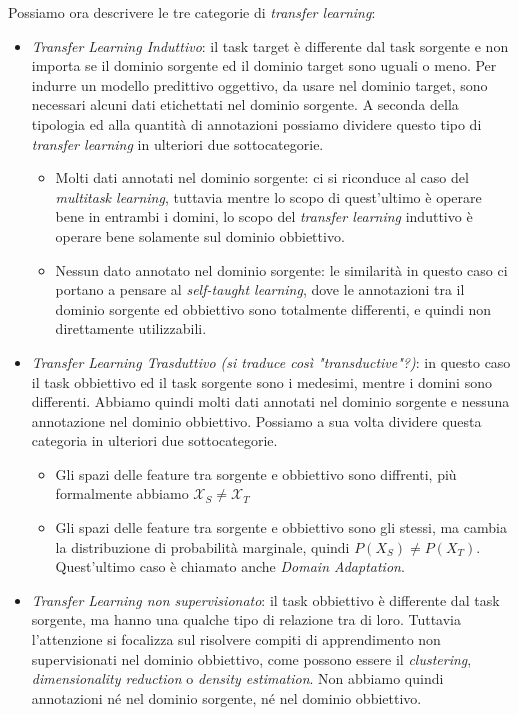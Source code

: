 Possiamo ora descrivere le tre categorie di \textit{transfer learning}:
\begin{itemize}
    \item \emph{Transfer Learning Induttivo}: il task target è differente dal task sorgente e non importa se il dominio sorgente ed il dominio target sono uguali o meno. Per indurre un modello predittivo oggettivo, da usare nel dominio target, sono necessari alcuni dati etichettati nel dominio sorgente. A seconda della tipologia ed alla quantità di annotazioni possiamo dividere questo tipo di \textit{transfer learning} in ulteriori due sottocategorie.
    \begin{itemize}
        \item Molti dati annotati nel dominio sorgente: ci si riconduce al caso del \textit{multitask learning}, tuttavia mentre lo scopo di quest'ultimo è operare bene in entrambi i domini, lo scopo del \textit{transfer learning} induttivo è operare bene solamente sul dominio obbiettivo.
        \item Nessun dato annotato nel dominio sorgente: le similarità in questo caso ci portano a pensare al \textit{self-taught learning}, dove le annotazioni tra il dominio sorgente ed obbiettivo sono totalmente differenti, e quindi non direttamente utilizzabili. 
    \end{itemize}
    \item \emph{Transfer Learning Trasduttivo (si traduce così "transductive"?)}: in questo caso il task obbiettivo ed il task sorgente sono i medesimi, mentre i domini sono differenti. Abbiamo quindi molti dati annotati nel dominio sorgente e nessuna annotazione nel dominio obbiettivo. Possiamo a sua volta dividere questa categoria in ulteriori due sottocategorie.
    \begin{itemize}
        \item Gli spazi delle feature tra sorgente e obbiettivo sono diffrenti, più formalmente abbiamo $\mathcal{X}_S \neq \mathcal{X}_T$
        \item Gli spazi delle feature tra sorgente e obbiettivo sono gli stessi, ma cambia la distribuzione di probabilità marginale, quindi $P(X_S) \neq P(X_T)$. Quest'ultimo caso è chiamato anche \emph{Domain Adaptation}.
    \end{itemize}
    \item \emph{Transfer Learning non supervisionato}: il task obbiettivo è differente dal task sorgente, ma hanno una qualche tipo di relazione tra di loro. Tuttavia l'attenzione si focalizza sul risolvere compiti di apprendimento non supervisionati nel dominio obbiettivo, come possono essere il \textit{clustering}, \textit{dimensionality reduction} o \textit{density estimation}. Non abbiamo quindi annotazioni né nel dominio sorgente, né nel dominio obbiettivo.
\end{itemize}
